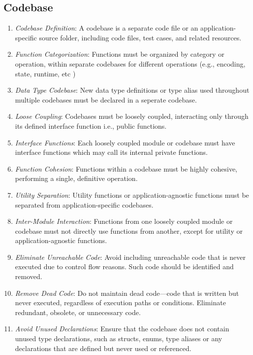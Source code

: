 \documentclass[9pt]{IEEEtran} %
\begin{document}
\tableofcontents

\subsection{Codebase}
\label{ESSCodebase}

\begin{enumerate}
  \item \textit{Codebase Definition}: A codebase is a separate code file or an application-specific source folder, including code files, test cases, and related resources.
  \item \textit{Function Categorization}: Functions must be organized by category or operation, within separate codebases for different operations (e.g., encoding, state, runtime, etc )
  \item \textit{Data Type Codebase}: New data type definitions or type alias used throughout multiple codebases must be declared in a seperate codebase.
  \item \textit{Loose Coupling}: Codebases must be loosely coupled, interacting only through its defined interface function i.e., public functions.
  \item \textit{Interface Functions}: Each loosely coupled module or codebase must have interface functions which may call its internal private functions.
  \item \textit{Function Cohesion}: Functions within a codebase must be highly cohesive, performing a single, definitive operation.
  \item \textit{Utility Separation}: Utility functions or application-agnostic functions must be separated from application-specific codebases.
  \item \textit{Inter-Module Interaction}: Functions from one loosely coupled module or codebase must not directly use functions from another, except for utility or application-agnostic functions.
  \item \textit{Eliminate Unreachable Code}: Avoid including unreachable code that is never executed due to control flow reasons. Such code should be identified and removed.
  \item \textit{Remove Dead Code}: Do not maintain dead code—code that is written but never executed, regardless of execution paths or conditions. Eliminate redundant, obsolete, or unnecessary code.
  \item \textit{Avoid Unused Declarations}: Ensure that the codebase does not contain unused type declarations, such as structs, enums, type aliases or any declarations that are defined but never used or referenced. 

\end{enumerate}
\end{document}
